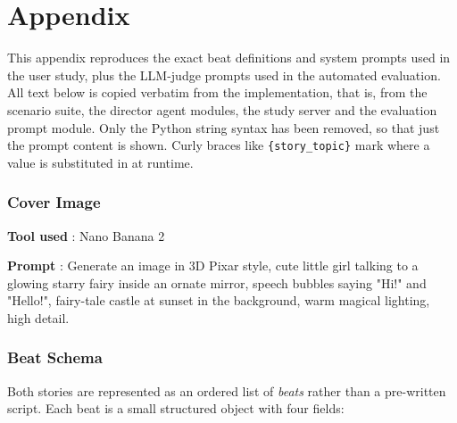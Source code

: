 \chapter{Appendix}


\lstset{
  basicstyle=\ttfamily\small,
  breaklines=true,
  breakatwhitespace=false,
  columns=fullflexible,
  frame=single,
  framesep=3pt,
  xleftmargin=3pt,
  xrightmargin=3pt,
  showstringspaces=false,
} 

This appendix reproduces the exact beat definitions and system prompts used
in the user study, plus the LLM-judge prompts used in the automated
evaluation. All text below is copied verbatim from the implementation,
that is, from the scenario suite, the director agent modules, the study server
and the evaluation prompt module. Only the Python string syntax has been
removed, so that just the prompt content is shown. Curly braces like
\texttt{\{story\_topic\}} mark where a value is substituted in at runtime.
\subsection{Cover Image}
\label{app:cover}
\textbf{Tool used} : Nano Banana 2 

\textbf{Prompt} : Generate an image in 3D Pixar style, cute little girl talking to a glowing starry fairy inside an ornate mirror, speech bubbles saying "Hi!" and "Hello!", fairy-tale castle at sunset in the background, warm magical lighting, high detail.






\subsection{Beat Schema}
\label{app:beat-schema}

Both stories are represented as an ordered list of \emph{beats} rather than
a pre-written script. Each beat is a small structured object with four
fields:

